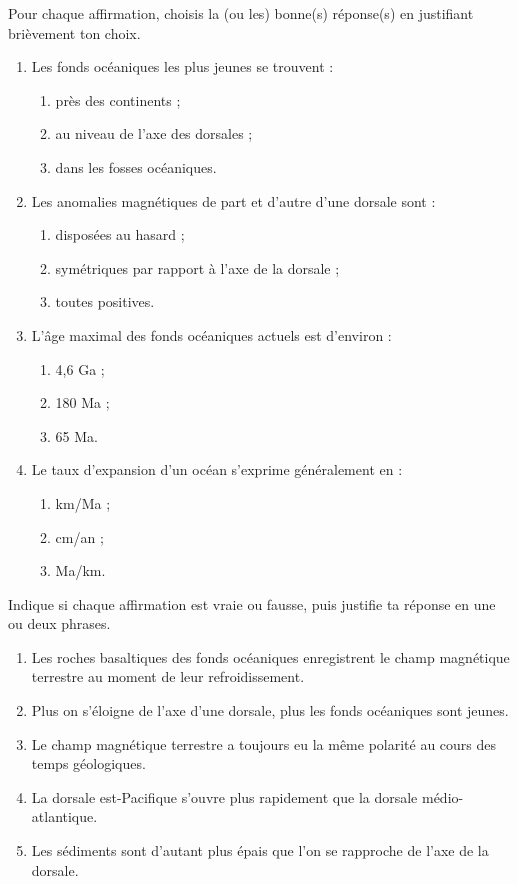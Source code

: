 \documentclass[11pt]{article}
\begin{document}
\begin{exercice}
Pour chaque affirmation, choisis la (ou les) bonne(s) réponse(s) en justifiant brièvement ton choix.
\begin{enumerate}
\item Les fonds océaniques les plus jeunes se trouvent :
\begin{enumerate}
\item près des continents ;
\item au niveau de l'axe des dorsales ;
\item dans les fosses océaniques.
\end{enumerate}
\item Les anomalies magnétiques de part et d'autre d'une dorsale sont :
\begin{enumerate}
\item disposées au hasard ;
\item symétriques par rapport à l'axe de la dorsale ;
\item toutes positives.
\end{enumerate}
\item L'âge maximal des fonds océaniques actuels est d'environ :
\begin{enumerate}
\item 4,6 Ga ;
\item 180 Ma ;
\item 65 Ma.
\end{enumerate}
\item Le taux d'expansion d'un océan s'exprime généralement en :
\begin{enumerate}
\item km/Ma ;
\item cm/an ;
\item Ma/km.
\end{enumerate}
\end{enumerate}
\end{exercice}

\begin{exercice}
Indique si chaque affirmation est vraie ou fausse, puis justifie ta réponse en une ou deux phrases.
\begin{enumerate}
\item Les roches basaltiques des fonds océaniques enregistrent le champ magnétique terrestre au moment de leur refroidissement.
\item Plus on s'éloigne de l'axe d'une dorsale, plus les fonds océaniques sont jeunes.
\item Le champ magnétique terrestre a toujours eu la même polarité au cours des temps géologiques.
\item La dorsale est-Pacifique s'ouvre plus rapidement que la dorsale médio-atlantique.
\item Les sédiments sont d'autant plus épais que l'on se rapproche de l'axe de la dorsale.
\end{enumerate}
\end{exercice}
\end{document}
